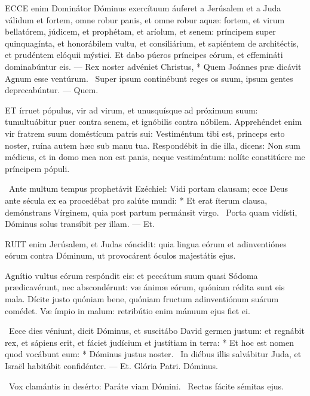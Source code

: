 

\lettrine[lines=2]{E}{CCE} enim Dominátor Dóminus exercítuum áuferet a Jerúsalem et a Juda válidum et fortem, omne robur panis, et omne robur aquæ: fortem, et virum bellatórem, júdicem, et prophétam, et aríolum, et senem: príncipem super quinquagínta, et honorábilem vultu, et consiliárium, et sapiéntem de architéctis, et prudéntem elóquii mýstici. Et dabo púeros príncipes eórum, et effemináti dominabúntur eis. --- Rex noster advéniet Christus, * Quem Joánnes præ dicávit Agnum esse ventúrum. \V\ Super ipsum continébunt reges os suum, ipsum gentes deprecabúntur. --- Quem.


\lettrine[lines=2]{E}{T} írruet pópulus, vir ad virum, et unusquísque ad próximum suum: tumultuábitur puer contra senem, et ignóbilis contra nóbilem. Apprehéndet enim vir fratrem suum doméstícum patris sui: Vestiméntum tibi est, princeps esto noster, ruína autem hæc sub manu tua. Respondébit in die illa, dicens: Non sum médicus, et in domo mea non est panis, neque vestiméntum: nolíte constitúere me príncipem pópuli.

\R\ Ante multum tempus prophetávit Ezéchiel: Vidi portam clausam; ecce Deus ante sécula ex ea procedébat pro salúte mundi: * Et erat íterum clausa, demónstrans Vírginem, quia post partum permánsit virgo. \V\ Porta quam vidísti, Dóminus solus transíbit per illam. --- Et.


\lettrine[lines=2]{R}{UIT} enim Jerúsalem, et Judas cóncidit: quia lingua eórum et adinventiónes eórum contra Dóminum, ut provocárent óculos majestátis ejus.

Agnítio vultus eórum respóndit eis: et peccátum suum quasi Sódoma prædicavérunt, nec abscondérunt: væ ánimæ eórum, quóniam rédita sunt eis mala. Dícite justo quóniam bene, quóniam fructum adinventiónum suárum comédet. Væ ímpio in malum: retribútio enim mánuum ejus fiet ei.

\R\ Ecce dies véniunt, dicit Dóminus, et suscitábo David germen justum: et regnábit rex, et sápiens erit, et fáciet judícium et justítiam in terra: * Et hoc est nomen quod vocábunt eum: * Dóminus justus noster. \V\ In diébus illis salvábitur Juda, et Israël habitábit confidénter. --- Et. Glória Patri. Dóminus.

\V\ Vox clamántis in desérto: Paráte viam Dómini. \R\ Rectas fácite sémitas ejus.

